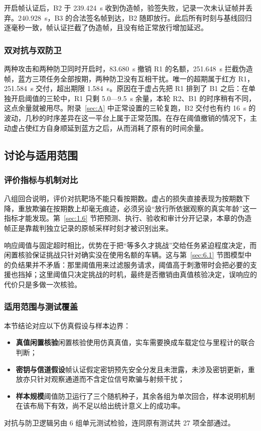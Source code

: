 开启帧认证后，B2 于 239.424~s 收到伪造帧，验签失败，记录一次未认证帧并丢弃。240.928~s，B3 的合法签名帧到达，B2 随即放行。此后所有时刻与基线回归逐毫秒一致，帧认证拦截了伪造帧，且没有给正常放行增加延迟。

\subsubsection*{双对抗与双防卫}

两种攻击和两种防卫同时开启时，83.680~s 撤销 R1 的名额，251.648~s 拦截伪造帧，蓝方三项任务全部按期，两种防卫没有互相干扰。唯一的超期属于红方 R1，251.584~s 交付，超出期限 1.584~s。原因在于虚占先把 R1 排到了 B1 之后：在单独开启阈值的三轮中，R1 只剩 5.0—9.5~s 余量，本轮 R2、B1 的时序稍有不同，这点余量就被用尽。附录~\ref{sec:A} 中正常设置的三轮复跑，B2 交付也有约 16~s 的波动，几秒的时序差异在这一平台上属于正常范围。在存在阈值撤销的情况下，主动虚占使红方自身顺延到蓝方之后，从而消耗了原有的时间余量。

\subsection{讨论与适用范围}\label{sec:adv.6}

\subsubsection*{评价指标与机制对比}

八组回合说明，评价对抗靶场不能只看按期数。虚占的损失直接表现为按期数下降，重放欺骗在按期数上却毫无痕迹，必须另设“放行所依据观察的真实年龄”这一指标才能发现。第~\ref{sec:1.6} 节把预测、执行、验收和审计分开记录，本章的伪造帧正是靠裁判独立记录的原帧采样时刻才被识别出来。

响应阈值与固定超时相比，优势在于把“等多久才挑战”交给任务紧迫程度决定，而闲置核验保证挑战只针对确实没在使用名额的车辆。这与第~\ref{sec:6.1} 节图模型中的负结果并不矛盾：那里阈值用来过滤服务请求，阈值高于刺激带时会把必要的支援也挡掉；这里阈值只决定挑战的时机，最终是否撤销由真值核验决定，误响应的代价只是多做一次核验。

\subsubsection*{适用范围与测试覆盖}

本节结论对应以下仿真假设与样本边界：
\begin{itemize}
\item \textbf{真值闲置核验}\quad 闲置核验使用仿真真值，实车需要换成车载定位与里程计的联合判断；
\item \textbf{密钥与信道假设}\quad 帧认证假定密钥预先安全分发且未泄露，未涉及密钥更新，重放亦只针对观察通道而不含定位信号欺骗与射频干扰；
\item \textbf{样本规模}\quad 阈值防卫运行了三个随机种子，其余各组为单次回合，样本说明机制在该布局下有效，尚不足以给出统计意义上的成功率。
\end{itemize}
对抗与防卫逻辑另由 6 组单元测试检验，连同原有测试共 27 项全部通过。
